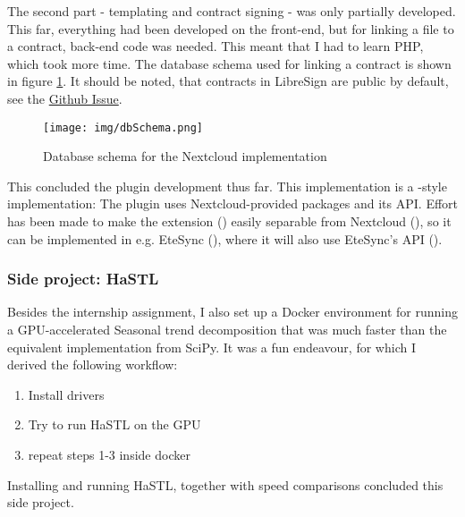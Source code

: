 \documentclass[journal, dvipsnames]{IEEEtran}
\begin{document}
The second part - templating and contract signing - was only partially developed. This far, everything had been developed on the front-end, but for linking a file to a contract, back-end code was needed. This meant that I had to learn PHP, which took more time. The database schema used for linking a contract is shown in figure \ref{fig_dbSchema}. It should be noted, that contracts in LibreSign are public by default, see the \href{https://github.com/LibreSign/libresign/issues/686}{Github Issue}. 

\begin{figure}
  \centering
  \texttt{[image: img/dbSchema.png]}
  \caption{Database schema for the Nextcloud implementation}
  \label{fig_dbSchema}
\end{figure}

This concluded the plugin development thus far. This implementation is a -style implementation: The plugin uses Nextcloud-provided packages and its API. Effort has been made to make the extension () easily separable from Nextcloud (), so it can be implemented in e.g. EteSync (), where it will also use EteSync's API ().

\subsubsection{Side project: HaSTL}

Besides the internship assignment, I also set up a Docker environment for running a GPU-accelerated Seasonal trend decomposition that was much faster than the equivalent implementation from SciPy. It was a fun endeavour, for which I derived the following workflow:
\begin{enumerate}
  \item Install drivers
  \item Try to run HaSTL on the GPU
  \item repeat steps 1-3 inside docker
\end{enumerate}
Installing and running HaSTL, together with speed comparisons concluded this side project.
\end{document}
